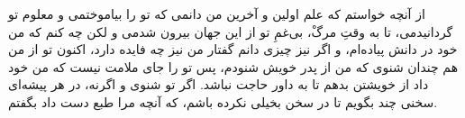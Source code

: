از آنچه خواستم كه علم اولين و آخرين من دانمى كه تو را بياموختمى و معلوم تو گردانيدمى، تا به وقتِ مرگْ، بى‌غمِ تو از اين جهان بيرون شدمى و لكن چه كنم كه من خود در دانش پياده‌ام، و اگر نيز چيزى دانم گفتار من نيز چه فايده دارد، اكنون تو از من هم چندان شنوى كه من از پدر خويش شنودم، پس تو را جاى ملامت نيست كه من خود داد از خويشتن بدهم تا به داور حاجت نباشد. اگر تو شنوى و اگرنه، در هر پيشه‌اى سخنى چند بگويم تا در سخن بخيلى نكرده باشم، كه آنچه مرا طبع دست داد بگفتم.




\newpage



























